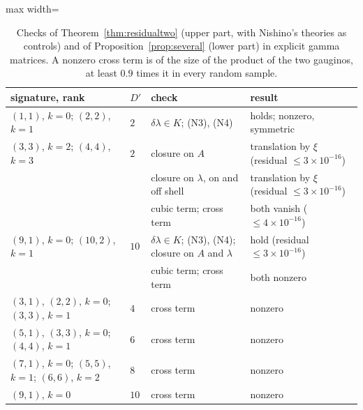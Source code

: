 \begin{table}[htbp]
\centering
\begin{adjustbox}{max width=\linewidth}\begin{tabular}{@{}llll@{}}
\toprule
signature, rank & $D'$ & check & result\\
\midrule
$(1,1)$, $k=0$; $(2,2)$, $k=1$ & $2$ & $\delta\lambda\in K$; (N3), (N4) & holds; nonzero, symmetric\\
$(3,3)$, $k=2$; $(4,4)$, $k=3$ & $2$ & closure on $A$ & translation by $\xi$ (residual $\le3\times10^{-16}$)\\
 & & closure on $\lambda$, on and off shell & translation by $\xi$ (residual $\le3\times10^{-16}$)\\
 & & cubic term; cross term & both vanish ($\le4\times10^{-16}$)\\
\midrule
$(9,1)$, $k=0$; $(10,2)$, $k=1$ & $10$ & $\delta\lambda\in K$; (N3), (N4); closure on $A$ and $\lambda$ & hold (residual $\le3\times10^{-16}$)\\
 & & cubic term; cross term & both nonzero\\
\midrule
$(3,1)$, $(2,2)$, $k=0$; $(3,3)$, $k=1$ & $4$ & cross term & nonzero\\
$(5,1)$, $(3,3)$, $k=0$; $(4,4)$, $k=1$ & $6$ & cross term & nonzero\\
$(7,1)$, $k=0$; $(5,5)$, $k=1$; $(6,6)$, $k=2$ & $8$ & cross term & nonzero\\
$(9,1)$, $k=0$ & $10$ & cross term & nonzero\\
\bottomrule
\end{tabular}\end{adjustbox}
\caption{Checks of Theorem~\ref{thm:residualtwo} (upper part, with Nishino's theories as controls) and of Proposition~\ref{prop:several} (lower part) in explicit gamma matrices. A nonzero cross term is of the size of the product of the two gauginos, at least $0.9$ times it in every random sample.}
\label{tab:residualtwo}
\end{table}
\FloatBarrier
